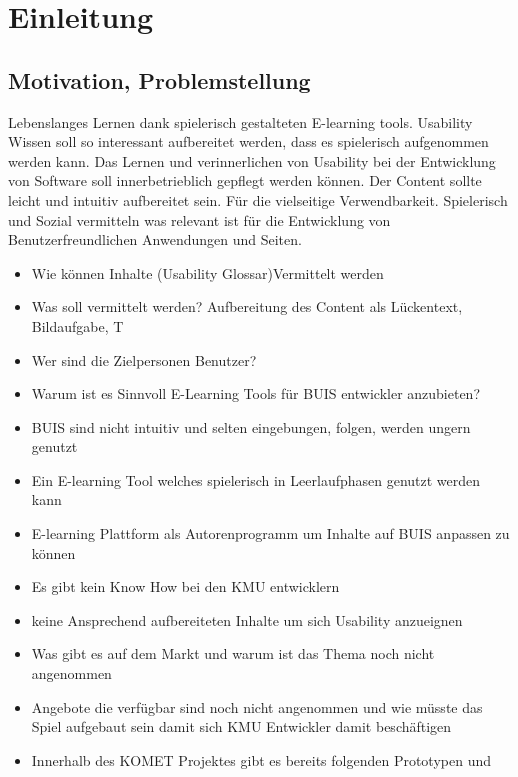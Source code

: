 \documentclass[a4paper, 12pt, twoside, BCOR=20mm, DIV=calc, abstracton, parskip=half*, toc=bibliography, toc=listof, headsepline, headings=small, numbers=enddot]{scrreprt} %
\begin{document}



\tableofcontents
\listoffigures

\chapter{Einleitung}\label{Einleitung}
\section{Motivation, Problemstellung}
Lebenslanges Lernen dank spielerisch gestalteten E-learning tools. Usability Wissen soll so interessant aufbereitet werden, dass es spielerisch aufgenommen werden kann. Das Lernen und verinnerlichen von Usability bei der Entwicklung von Software soll innerbetrieblich gepflegt werden können. 
Der Content sollte leicht und intuitiv aufbereitet sein. Für die vielseitige Verwendbarkeit. Spielerisch und Sozial vermitteln was relevant ist für die Entwicklung von Benutzerfreundlichen Anwendungen und Seiten.



\begin{itemize}

\item Wie können Inhalte (Usability Glossar)Vermittelt werden
\item Was soll vermittelt werden? Aufbereitung des Content als Lückentext, Bildaufgabe, T
\item Wer sind die Zielpersonen Benutzer?
\item Warum ist es Sinnvoll E-Learning Tools für BUIS entwickler anzubieten?
\item BUIS sind nicht intuitiv und selten eingebungen, folgen, werden ungern genutzt
\item Ein E-learning Tool welches spielerisch in Leerlaufphasen genutzt werden kann
\item E-learning Plattform als Autorenprogramm um Inhalte auf BUIS anpassen zu können
\item Es gibt kein Know How bei den KMU entwicklern
\item keine Ansprechend aufbereiteten Inhalte um sich Usability anzueignen
\item Was gibt es auf dem Markt und warum ist das Thema noch nicht angenommen
\item Angebote die verfügbar sind noch nicht angenommen und wie müsste das Spiel aufgebaut sein damit sich KMU Entwickler damit beschäftigen
\item Innerhalb des KOMET Projektes gibt es bereits folgenden Prototypen und 
\end{itemize}
\end{document}
